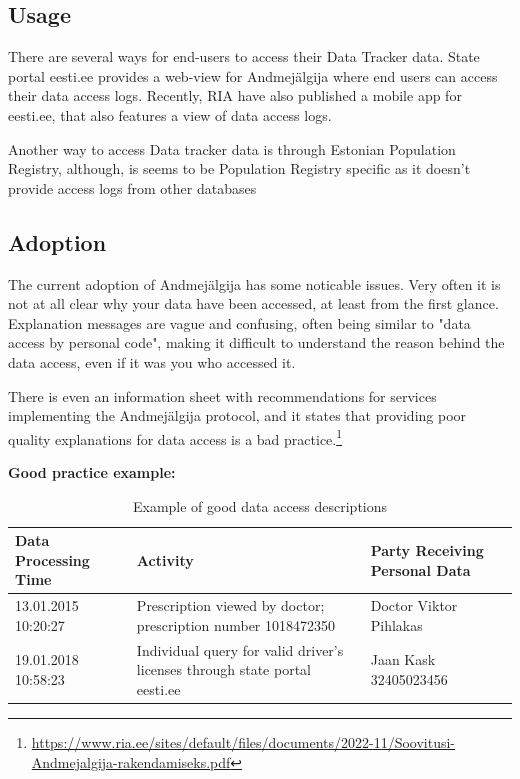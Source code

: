 \subsection{Usage}
There are several ways for end-users to access their Data Tracker data. State portal eesti.ee provides a web-view for Andmejälgija where end users can access their data access logs. Recently, RIA have also published a mobile app for eesti.ee, that also features a view of data access logs. 

Another way to access Data tracker data is through Estonian Population Registry, although, is seems to be Population Registry specific as it doesn't provide access logs from other databases



\subsection{Adoption}
The current adoption of Andmejälgija has some noticable issues. Very often it is not at all clear why your data have been accessed, at least from the first glance. Explanation messages are vague and confusing, often being similar to "data access by personal code", making it difficult to understand the reason behind the data access, even if it was you who accessed it.

There is even an information sheet with recommendations for services implementing the Andmejälgija protocol, and it states that providing poor quality explanations for data access is a bad practice.\footnote{\url{https://www.ria.ee/sites/default/files/documents/2022-11/Soovitusi-Andmejalgija-rakendamiseks.pdf}} 

\textbf{Good practice example:}

\begin{table}[h]
\centering
\begin{tabular}{|p{3cm}|p{6cm}|p{4cm}|}
\hline
\textbf{Data Processing Time} & \textbf{Activity} & \textbf{Party Receiving Personal Data} \\
\hline
13.01.2015 10:20:27 & Prescription viewed by doctor; prescription number 1018472350 & Doctor Viktor Pihlakas \\
\hline
19.01.2018 10:58:23 & Individual query for valid driver's licenses through state portal eesti.ee & Jaan Kask 32405023456 \\
\hline
\end{tabular}
\caption{Example of good data access descriptions}
\end{table}


